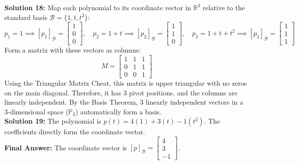 \documentclass{article}
\begin{document}
\textbf{Solution 18:}
Map each polynomial to its coordinate vector in $\mathbb{R}^3$ relative to the standard basis $\mathcal{B} = \{1, t, t^2\}$:
$$ p_1 = 1 \implies [p_1]_\mathcal{B} = \begin{bmatrix} 1 \\ 0 \\ 0 \end{bmatrix}, \quad p_2 = 1+t \implies [p_2]_\mathcal{B} = \begin{bmatrix} 1 \\ 1 \\ 0 \end{bmatrix}, \quad p_3 = 1+t+t^2 \implies [p_3]_\mathcal{B} = \begin{bmatrix} 1 \\ 1 \\ 1 \end{bmatrix} $$
Form a matrix with these vectors as columns:
$$ M = \begin{bmatrix} 1 & 1 & 1 \\ 0 & 1 & 1 \\ 0 & 0 & 1 \end{bmatrix} $$
Using the Triangular Matrix Cheat, this matrix is upper triangular with no zeros on the main diagonal. Therefore, it has 3 pivot positions, and the columns are linearly independent. By the Basis Theorem, 3 linearly independent vectors in a 3-dimensional space ($\mathbb{P}_2$) automatically form a basis. \\

\textbf{Solution 19:}
The polynomial is $p(t) = 4(1) + 3(t) - 1(t^2)$. The coefficients directly form the coordinate vector. \\
\textbf{Final Answer:} The coordinate vector is $[p]_\mathcal{B} = \begin{bmatrix} 4 \\ 3 \\ -1 \end{bmatrix}$. \\
\end{document}
